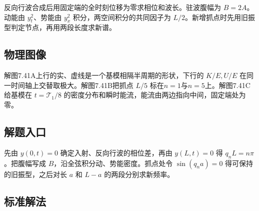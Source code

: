 \documentclass[UTF8,fontset=fandol,a4paper,11pt]{ctexart}
\begin{document}
反向行波合成后用固定端的全时刻位移为零求相位和波长。驻波腹幅为 $B=2A$。动能由 $y_t^2$、势能由 $y_x^2$ 积分，两空间积分的共同因子为 $L/2$。新增抓点时先用旧振型判定节点，再用两段长度求新谱。




\subsection*{物理图像}

解图7.41A上行的实、虚线是一个基模相隔半周期的形状，下行的 $K/E,U/E$ 在同一时间轴上交替取极大。解图7.41B把抓点 $L/5$ 标在$n=1$与$n=5$上。解图7.41C给基模在 $t=\mathcal T_1/8$ 的密度分布和瞬时能流，能流由两边指向中间，固定端处为零。




\subsection*{解题入口}

先由 $y(0,t)=0$ 确定入射、反向行波的相位差，再由 $y(L,t)=0$ 得 $q_nL=n\pi$。把腹幅写成 $B$，沿全弦积分动、势能密度。抓点处令 $\sin(q_na)=0$ 得可保持的旧振型，之后对长 $a$ 和 $L-a$ 的两段分别求新频率。



\subsection*{标准解法}
\end{document}

